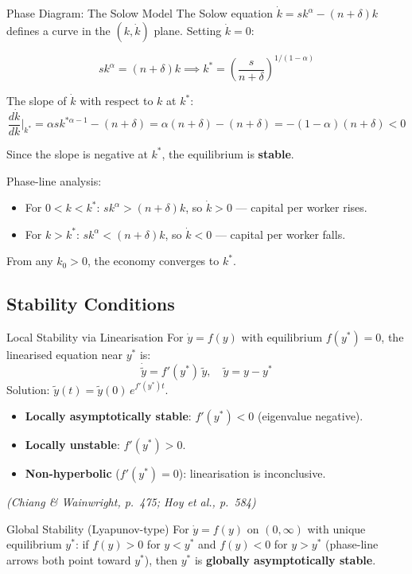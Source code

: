 \documentclass[12pt, a4paper]{article}
\theoremstyle{definition}
\begin{document}
\begin{exbox}{Phase Diagram: The Solow Model}
The Solow equation $\dot k = sk^\alpha - (n+\delta)k$ defines a curve in
the $(k, \dot k)$ plane. Setting $\dot k = 0$:

\[
  sk^\alpha = (n+\delta)k \implies k^* = \left(\frac{s}{n+\delta}\right)^{1/(1-\alpha)}
\]

The slope of $\dot k$ with respect to $k$ at $k^*$:
\[
  \frac{d\dot k}{dk}\bigg|_{k^*}
  = \alpha sk^{*\alpha-1} - (n+\delta)
  = \alpha(n+\delta) - (n+\delta)
  = -(1-\alpha)(n+\delta) < 0
\]

Since the slope is negative at $k^*$, the equilibrium is \textbf{stable}.

Phase-line analysis:
\begin{itemize}
  \item For $0 < k < k^*$: $sk^\alpha > (n+\delta)k$, so $\dot k > 0$ ---
        capital per worker rises.
  \item For $k > k^*$: $sk^\alpha < (n+\delta)k$, so $\dot k < 0$ ---
        capital per worker falls.
\end{itemize}
From any $k_0 > 0$, the economy converges to $k^*$.
\end{exbox}

\subsection{Stability Conditions}

\begin{thmbox}{Local Stability via Linearisation}
For $\dot y = f(y)$ with equilibrium $f(y^*)=0$, the linearised equation
near $y^*$ is:
\[
  \dot{\tilde y} = f'(y^*)\,\tilde y, \quad \tilde y = y - y^*
\]
Solution: $\tilde y(t) = \tilde y(0)\,e^{f'(y^*)t}$.
\begin{itemize}
  \item \textbf{Locally asymptotically stable}: $f'(y^*)<0$ (eigenvalue negative).
  \item \textbf{Locally unstable}: $f'(y^*)>0$.
  \item \textbf{Non-hyperbolic} ($f'(y^*)=0$): linearisation is inconclusive.
\end{itemize}
\emph{(Chiang \& Wainwright, p.\ 475; Hoy et al., p.\ 584)}
\end{thmbox}

\begin{thmbox}{Global Stability (Lyapunov-type)}
For $\dot y = f(y)$ on $(0,\infty)$ with unique equilibrium $y^*$:
if $f(y)>0$ for $y<y^*$ and $f(y)<0$ for $y>y^*$ (phase-line arrows both
point toward $y^*$), then $y^*$ is \textbf{globally asymptotically stable}.
\end{thmbox}
\newpage
\end{document}

